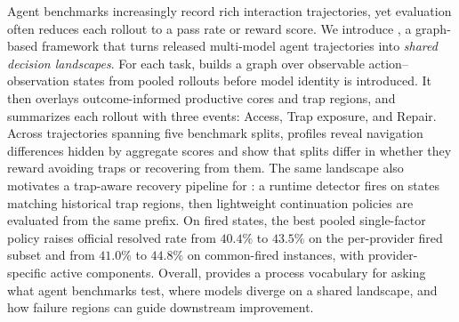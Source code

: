 Agent benchmarks increasingly record rich interaction trajectories, yet evaluation often reduces each rollout to a pass rate or reward score.
We introduce \method{}, a graph-based framework that turns released multi-model agent trajectories into \emph{shared decision landscapes}.
For each task, \method{} builds a graph over observable action--observation states from pooled rollouts before model identity is introduced.
It then overlays outcome-informed productive cores and trap regions, and summarizes each rollout with three events: Access, Trap exposure, and Repair.
Across trajectories spanning five benchmark splits, \method{} profiles reveal navigation differences hidden by aggregate scores and show that splits differ in whether they reward avoiding traps or recovering from them.
The same \method{} landscape also motivates a trap-aware recovery pipeline for \swe{}: a runtime detector fires on states matching historical trap regions, then lightweight continuation policies are evaluated from the same prefix.
On fired states, the best pooled single-factor policy raises official resolved rate from $40.4\%$ to $43.5\%$ on the per-provider fired subset and from $41.0\%$ to $44.8\%$ on common-fired instances, with provider-specific active components.
Overall, \method{} provides a process vocabulary for asking what agent benchmarks test, where models diverge on a shared landscape, and how failure regions can guide downstream improvement.
